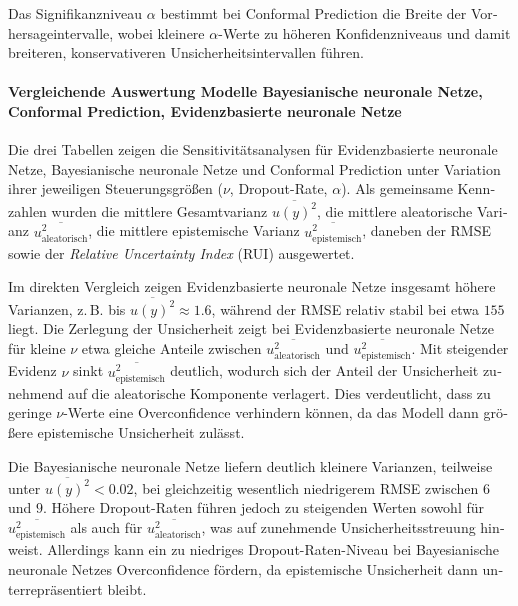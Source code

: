 \begin{otherlanguage}{ngerman}
Das Signifikanzniveau $\alpha$ bestimmt bei \gls{Conformal Prediction} die Breite der Vorhersageintervalle, wobei kleinere $\alpha$-Werte zu höheren Konfidenzniveaus und damit breiteren, konservativeren Unsicherheitsintervallen führen.



\paragraph{Vergleichende Auswertung Modelle \gls{Bayesianische neuronale Netze}, \gls{Conformal Prediction}, \gls{Evidenzbasierte neuronale Netze}}

Die drei Tabellen zeigen die Sensitivitätsanalysen für \gls{Evidenzbasierte neuronale Netze}, \gls{Bayesianische neuronale Netze} und \gls{Conformal Prediction} unter Variation ihrer jeweiligen Steuerungsgrößen (\(\nu\), Dropout-Rate, \(\alpha\)). Als gemeinsame Kennzahlen wurden die mittlere Gesamtvarianz \(\overline{u(y)^2}\), die mittlere aleatorische Varianz \(\overline{u_{\text{aleatorisch}}^2}\), die mittlere epistemische Varianz \(\overline{u_{\text{epistemisch}}^2}\), daneben der RMSE sowie der \emph{Relative Uncertainty Index} (RUI) ausgewertet.  

Im direkten Vergleich zeigen \gls{Evidenzbasierte neuronale Netze} insgesamt höhere Varianzen, z.\,B. bis \(\overline{u(y)^2} \approx 1.6\), während der RMSE relativ stabil bei etwa \(155\) liegt. Die Zerlegung der Unsicherheit zeigt bei \gls{Evidenzbasierte neuronale Netze} für kleine \(\nu\) etwa gleiche Anteile zwischen \(\overline{u_{\text{aleatorisch}}^2}\) und \(\overline{u_{\text{epistemisch}}^2}\). Mit steigender Evidenz \(\nu\) sinkt \(\overline{u_{\text{epistemisch}}^2}\) deutlich, wodurch sich der Anteil der Unsicherheit zunehmend auf die aleatorische Komponente verlagert. Dies verdeutlicht, dass zu geringe \(\nu\)-Werte eine Overconfidence verhindern können, da das Modell dann größere epistemische Unsicherheit zulässt.  

Die \gls{Bayesianische neuronale Netze} liefern deutlich kleinere Varianzen, teilweise unter \(\overline{u(y)^2} < 0.02\), bei gleichzeitig wesentlich niedrigerem RMSE zwischen \(6\) und \(9\). Höhere Dropout-Raten führen jedoch zu steigenden Werten sowohl für \(\overline{u_{\text{epistemisch}}^2}\) als auch für \(\overline{u_{\text{aleatorisch}}^2}\), was auf zunehmende Unsicherheitsstreuung hinweist. Allerdings kann ein zu niedriges Dropout-Raten-Niveau bei \gls{Bayesianische neuronale Netze}s Overconfidence fördern, da epistemische Unsicherheit dann unterrepräsentiert bleibt.  


\end{otherlanguage}
